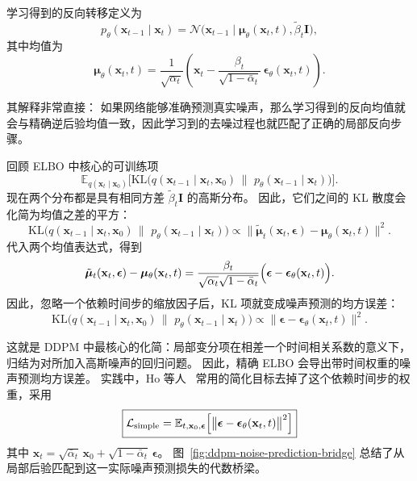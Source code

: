 学习得到的反向转移定义为
\[
p_\theta(\mathbf{x}_{t-1}\mid \mathbf{x}_t)
=
\mathcal{N}\!\bigl(
\mathbf{x}_{t-1}\mid
\boldsymbol{\mu}_\theta(\mathbf{x}_t,t),
\tilde{\beta}_t\mathbf{I}
\bigr),
\]
其中均值为
\[
\boldsymbol{\mu}_\theta(\mathbf{x}_t,t)
=
\frac{1}{\sqrt{\alpha_t}}
\left(
\mathbf{x}_t
-
\frac{\beta_t}{\sqrt{1-\bar{\alpha}_t}}\,
\boldsymbol{\epsilon}_\theta(\mathbf{x}_t,t)
\right).
\]

其解释非常直接：
如果网络能够准确预测真实噪声，那么学习得到的反向均值就会与精确逆后验均值一致，因此学习到的去噪过程也就匹配了正确的局部反向步骤。

\bigskip

回顾 ELBO 中核心的可训练项
\[
\mathbb{E}_{q(\mathbf{x}_t\mid \mathbf{x}_0)}
\Big[
\mathrm{KL}\!\big(
q(\mathbf{x}_{t-1}\mid \mathbf{x}_t,\mathbf{x}_0)
\,\|\,\,
p_\theta(\mathbf{x}_{t-1}\mid \mathbf{x}_t)
\big)
\Big].
\]
现在两个分布都是具有相同方差
$\tilde{\beta}_t\mathbf{I}$ 的高斯分布。
因此，它们之间的 KL 散度会化简为均值之差的平方：
\[
\mathrm{KL}\!\big(
q(\mathbf{x}_{t-1}\mid \mathbf{x}_t,\mathbf{x}_0)
\,\|\,\,
p_\theta(\mathbf{x}_{t-1}\mid \mathbf{x}_t)
\big)
\propto
\bigl\|
\tilde{\boldsymbol{\mu}}_t(\mathbf{x}_t,\boldsymbol{\epsilon})
-
\boldsymbol{\mu}_\theta(\mathbf{x}_t,t)
\bigr\|^2.
\]
代入两个均值表达式，得到
\[
\tilde{\boldsymbol{\mu}}_t(\mathbf{x}_t,\boldsymbol{\epsilon})
-
\boldsymbol{\mu}_\theta(\mathbf{x}_t,t)
=
\frac{\beta_t}{\sqrt{\alpha_t}\sqrt{1-\bar{\alpha}_t}}
\Bigl(
\boldsymbol{\epsilon}
-
\boldsymbol{\epsilon}_\theta(\mathbf{x}_t,t)
\Bigr).
\]
因此，忽略一个依赖时间步的缩放因子后，KL 项就变成噪声预测的均方误差：
\[
\mathrm{KL}\!\big(
q(\mathbf{x}_{t-1}\mid \mathbf{x}_t,\mathbf{x}_0)
\,\|\,\,
p_\theta(\mathbf{x}_{t-1}\mid \mathbf{x}_t)
\big)
\propto
\bigl\|
\boldsymbol{\epsilon}
-
\boldsymbol{\epsilon}_\theta(\mathbf{x}_t,t)
\bigr\|^2.
\]

这就是 DDPM 中最核心的化简：局部变分项在相差一个时间相关系数的意义下，归结为对所加入高斯噪声的回归问题。
因此，精确 ELBO 会导出带时间权重的噪声预测均方误差。
实践中，Ho 等人~\cite{ho2020denoising} 常用的简化目标去掉了这个依赖时间步的权重，采用
\[
\boxed{
\mathcal{L}_{\mathrm{simple}}
=
\mathbb{E}_{t,\mathbf{x}_0,\boldsymbol{\epsilon}}
\Bigl[
\bigl\|
\boldsymbol{\epsilon}
-
\boldsymbol{\epsilon}_\theta(\mathbf{x}_t,t)
\bigr\|^2
\Bigr]
}
\]
其中
$\mathbf{x}_t
=
\sqrt{\bar{\alpha}_t}\,\mathbf{x}_0
+
\sqrt{1-\bar{\alpha}_t}\,\boldsymbol{\epsilon}$。
图~\ref{fig:ddpm-noise-prediction-bridge} 总结了从局部后验匹配到这一实际噪声预测损失的代数桥梁。



